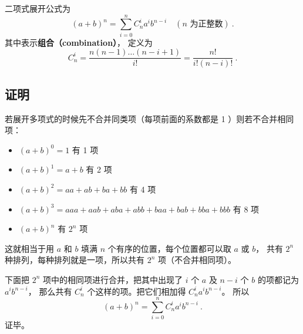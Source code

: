 
二项式展开公式为
\begin{equation}\label{eq_BiNor_1}
(a + b)^n = \sum_{i = 0}^n C_n^i a^i b^{n - i} \quad (n \text{ 为正整数})~.
\end{equation}
其中表示\textbf{组合（combination）}， 定义为
\begin{equation}
C_n^i = \frac{n(n - 1)\dots (n - i + 1)}{i!} = \frac{n!}{i!(n - i)!}~.
\end{equation}

\subsection{证明}\label{sub_BiNor_5}
若展开多项式的时候先不合并同类项（每项前面的系数都是 1 ）则若不合并相同项：
\begin{itemize}
\item $(a + b)^0 = 1$ 有 1 项
\item $(a + b)^1 = a + b$ 有 2 项
\item $(a + b)^2 = aa + ab + ba + bb$ 有 4 项
\item $(a + b)^3 = aaa + aab + aba + abb + baa + bab + bba + bbb$ 有 8 项
\item $(a + b)^n$ 有 $2^n$ 项
\end{itemize}

这就相当于用 $a$ 和 $b$ 填满 $n$ 个有序的位置，每个位置都可以取 $a$ 或 $b$， 共有 $2^n$ 种排列，每种排列就是一项，所以共有 $2^n$ 项（不合并相同项）。

下面把 $2^n$ 项中的相同项进行合并，把其中出现了 $i$ 个 $a$ 及 $n-i$ 个 $b$ 的项都记为 $a^i b^{n-i}$， 那么共有 $C_n^i$ 个这样的项。把它们相加得 $C_n^i a^i b^{n-i}$。 所以
\begin{equation}
(a + b)^n = \sum_{i = 0}^n  C_n^i a^i b^{n - i}~.
\end{equation}
证毕。
